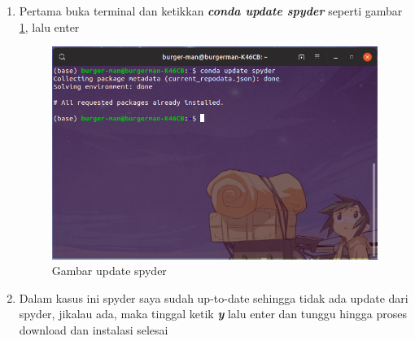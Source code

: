 \begin{enumerate}
\item Pertama buka terminal dan ketikkan \textbf{\textit{conda update spyder}} seperti gambar \ref{updatespyder}, lalu enter
\begin{figure}[H]
\centering
\includegraphics[width=1\textwidth]{figures/updatespyder.png}
\caption{Gambar update spyder}
\label{updatespyder}
\end{figure}

\item Dalam kasus ini spyder saya sudah up-to-date sehingga tidak ada update dari spyder, jikalau ada, maka tinggal ketik \textbf{\textit{y}} lalu enter dan tunggu hingga proses download dan instalasi selesai
\end{enumerate}